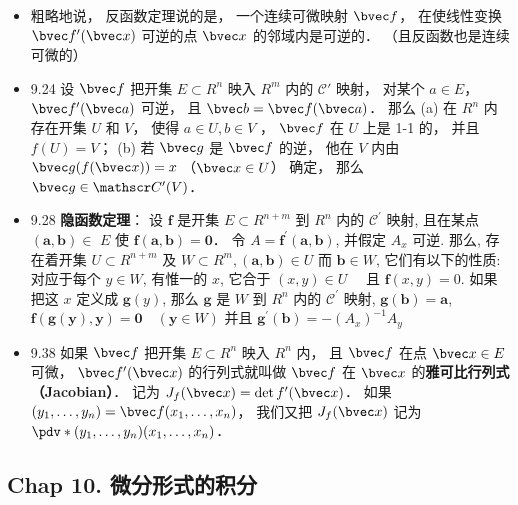\begin{itemize}
\item 粗略地说， 反函数定理说的是， 一个连续可微映射 $\bvec f$， 在使线性变换 $\bvec f'(\bvec x)$ 可逆的点 $\bvec x$ 的邻域内是可逆的． （且反函数也是连续可微的）

\item 9.24 设 $\bvec f$ 把开集 $E\subset R^n$ 映入 $R^m$ 内的 $\mathscr C'$ 映射， 对某个 $a\in E$， $\bvec f'(\bvec a)$ 可逆， 且 $\bvec b = \bvec f(\bvec a)$． 那么 (a) 在 $R^n$ 内存在开集 $U$ 和 $V$， 使得 $a\in U, b\in V$ ， $\bvec f$ 在 $U$ 上是 1-1 的， 并且 $f(U) = V$； (b) 若 $\bvec g$ 是 $\bvec f$ 的逆， 他在 $V$ 内由 $\bvec g(f(\bvec x)) = x$ （$\bvec x\in U$） 确定， 那么 $\bvec g\in \mathscr C'(V)$．

\item 9.28 \textbf{隐函数定理}： 设 $\mathbf{f}$ 是开集 $E \subset R^{n+m}$ 到 $R^{n}$ 内的 $\mathscr{C}^{\prime}$ 映射, 且在某点 $(\boldsymbol a, \boldsymbol b) \in$ $E$ 使 $\mathbf{f}(\boldsymbol{a}, \boldsymbol{b})=\mathbf{0}$． 令 $A=\mathbf{f}^{\prime}(\boldsymbol{a}, \boldsymbol{b})$, 并假定 $A_{x}$ 可逆.
那么, 存在着开集 $U \subset R^{n+m}$ 及 $W \subset R^{m},(\boldsymbol{a}, \boldsymbol{b}) \in U$ 而 $\boldsymbol{b} \in W$, 它们有以下的性质: 对应于每个 $y \in W$, 有惟一的 $x$, 它合于 $(x, y) \in U \quad$ 且 $\mathbf{f}(x, y)=0$. 如果把这 $x$ 定义成 $\mathbf{g}(y)$, 那么 $\mathbf{g}$ 是 $W$ 到 $R^{n}$ 内的 $\mathscr{C}^{\prime}$ 映射, $\mathbf{g}(\boldsymbol{b})=\boldsymbol{a}$, $\mathbf{f}(\mathbf{g}(\boldsymbol{y}), \boldsymbol{y})=\mathbf{0} \quad(\boldsymbol{y} \in W)$ 并且 $\mathbf{g}^{\prime}(\boldsymbol{b})=-\left(A_{x}\right)^{-1} A_{y}$

\item 9.38 如果 $\bvec f$ 把开集 $E\subset R^n$ 映入 $R^n$ 内， 且 $\bvec f$ 在点 $\bvec x\in E$ 可微， $\bvec f'(\bvec x)$ 的行列式就叫做 $\bvec f$ 在 $\bvec x$ 的\textbf{雅可比行列式（Jacobian）}． 记为 $J_f(\bvec x) = \det f'(\bvec x)$． 如果 $(y_1,\dots,y_n)=\bvec f(x_1,\dots, x_n)$， 我们又把 $J_f(\bvec x)$ 记为 $\pdv*{(y_1,\dots,y_n)}{(x_1,\dots, x_n)}$．
\end{itemize}

\subsection{Chap 10. 微分形式的积分}

